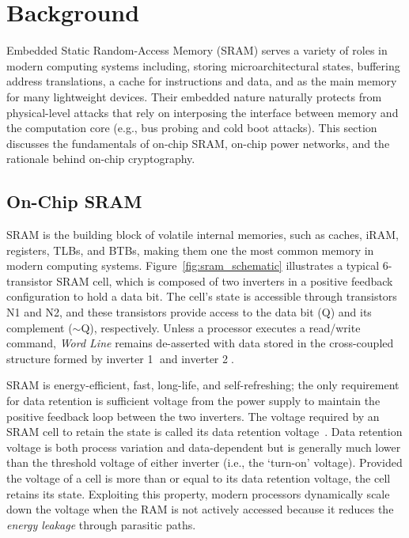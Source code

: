 \section{Background}
\label{sec_background}
Embedded Static Random-Access Memory (SRAM) serves a variety of roles in modern computing systems including, storing microarchitectural states, buffering address translations, a cache for instructions and data, and as the main memory for many lightweight devices. 
Their embedded nature naturally protects from physical-level attacks that rely on interposing the interface between memory and the computation core (e.g., bus probing and cold boot attacks).  
This section discusses the fundamentals of on-chip SRAM, on-chip power networks, and the rationale behind on-chip cryptography.
 
\subsection{On-Chip SRAM}

SRAM is the building block of volatile internal memories, such as caches, iRAM, registers, TLBs, and BTBs, making them one the most common memory in modern computing systems. 
Figure~\ref{fig:sram_schematic} illustrates a typical 6-transistor SRAM cell, which is composed of two inverters in a positive feedback configuration to hold a data bit.
The cell's state is accessible through transistors N1 and N2, and these transistors provide access to the data bit (Q) and its complement ($\sim$Q), respectively. 
Unless a processor executes a read/write command,  \textit{Word Line} remains de-asserted with data stored in the cross-coupled structure formed by inverter \textcircled{1} and inverter \textcircled{2}.

SRAM is energy-efficient, fast, long-life, and self-refreshing; the only requirement for data retention is sufficient voltage from the power supply to maintain the positive feedback loop between the two inverters.
The voltage required by an SRAM cell to retain the state is called its data retention voltage~\cite{holcomb2012drv}.
Data retention voltage is both process variation and data-dependent but is generally much lower than the threshold voltage of either inverter (i.e., the `turn-on' voltage).
Provided the voltage of a cell is more than or equal to its data retention voltage, the cell retains its state.
Exploiting this property, modern processors dynamically scale down the voltage when the RAM is not actively accessed because it reduces the \textit{energy leakage} through parasitic paths.

